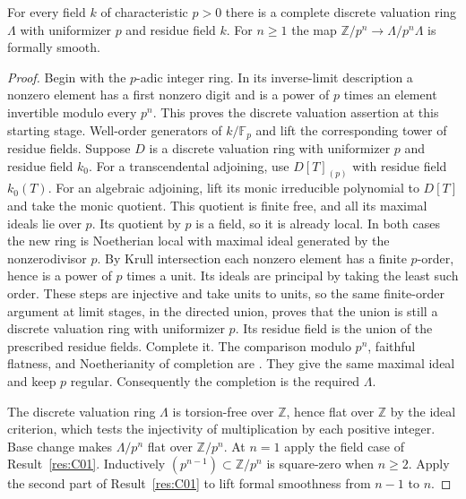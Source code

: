 \begin{lemma}\label{res:C02}
For every field \(k\) of characteristic \(p>0\) there is a complete
discrete valuation ring \(\Lambda\) with uniformizer \(p\) and residue
field \(k\). For \(n\ge1\) the map
\(\mathbb Z/p^n\to\Lambda/p^n\Lambda\) is formally smooth.
\end{lemma}
\begin{proof}
Begin with the \(p\)-adic integer ring. In its inverse-limit
description a nonzero element has a first nonzero digit and is a power
of \(p\) times an element invertible modulo every \(p^n\). This proves
the discrete valuation assertion at this starting stage.
Well-order generators of \(k/\mathbb F_p\) and lift the corresponding
tower of residue fields. Suppose \(D\) is a discrete valuation ring
with uniformizer \(p\) and residue field \(k_0\). For a transcendental
adjoining, use \(D[T]_{(p)}\) with residue field \(k_0(T)\).
For an algebraic adjoining, lift its monic irreducible polynomial to
\(D[T]\) and take the monic quotient. This quotient is finite free,
and all its maximal ideals lie over \(p\). Its quotient by \(p\)
is a field, so it is already local. In both cases the new ring
is Noetherian local with maximal ideal generated by the
nonzerodivisor \(p\). By Krull intersection each nonzero element
has a finite \(p\)-order, hence is a power of \(p\) times a unit.
Its ideals are principal by taking the least such order. These steps
are injective and take units to units, so the same finite-order
argument at limit stages, in the directed union, proves that the
union is still a discrete valuation ring with uniformizer \(p\).
Its residue field is the union of the prescribed residue fields.
Complete it. The comparison modulo \(p^n\), faithful flatness, and
Noetherianity of completion are
\cite[ALG-05-C04-S01]{p103}. They give the same maximal ideal and
keep \(p\) regular. Consequently the completion is the required
\(\Lambda\).

The discrete valuation ring \(\Lambda\) is torsion-free over
\(\mathbb Z\), hence flat over \(\mathbb Z\) by the ideal criterion, which
tests the injectivity of multiplication by each positive integer.
Base change makes \(\Lambda/p^n\) flat over \(\mathbb Z/p^n\).
At \(n=1\) apply the field case of Result~\ref{res:C01}. Inductively
\((p^{n-1})\subset\mathbb Z/p^n\) is square-zero when \(n\ge2\).
Apply the second part of Result~\ref{res:C01} to lift formal
smoothness from \(n-1\) to \(n\).
\end{proof}


